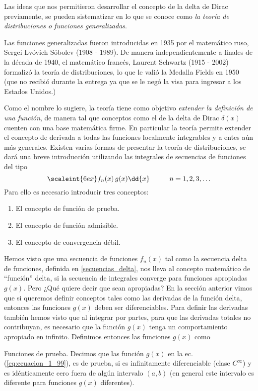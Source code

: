 Las ideas que nos permitieron desarrollar el concepto de la delta de Dirac previamente, se pueden sistematizar en lo que se conoce como \emph{la teoría de distribuciones o funciones generalizadas}.
\par
Las funciones generalizadas fueron introducidas en 1935 por el matemático ruso, Sergei Lvóvich Sóbolev (1908 - 1989). De manera independientemente a finales de la década de 1940, el matemático francés, Laurent Schwartz (1915 - 2002) formalizó la teoría de distribuciones, lo que le valió la Medalla Fields en 1950 (que no recibió durante la entrega ya que se le negó la visa para ingresar a los Estados Unidos.)
\par
Como el nombre lo sugiere, la teoría tiene como objetivo  \emph{extender la definición de una función}, de manera tal que conceptos como el de la delta de Dirac $\delta (x)$ cuenten con una base matemática firme. En particular la teoría permite extender el concepto de derivada a todas las funciones localmente integrables y a entes aún más generales. Existen varias formas de presentar la teoría de distribuciones, se dará una breve introducción utilizando las integrales de secuencias de funciones del tipo
\begin{equation}
\scaleint{6ex} f_{n} (x) \, g (x) \dd{x} \hspace{1cm} n = 1, 2, 3 , \ldots
\label{eq:ecuacion_1_99}
\end{equation}
Para ello es necesario introducir tres conceptos:
\begin{enumerate}
\item El concepto de función de prueba.
\item El concepto de función admisible.
\item El concepto de convergencia débil.
\end{enumerate}
Hemos visto que una secuencia de funciones $f_{n} (x)$ tal como la secuencia delta de funciones, definida en \ref{secuencias_delta}, nos lleva al concepto matemático de \enquote{función} delta, si la secuencia de integrales converge para funciones apropiadas $g (x)$. Pero ¿Qué quiere decir que sean apropiadas? En la sección anterior vimos que si queremos definir conceptos tales como las derivadas de la función delta, entonces las funciones $g (x)$ deben ser diferenciables. Para definir las derivadas también hemos visto que al integrar por partes, para que las derivadas totales no contribuyan, es necesario que la función $g (x)$ tenga un comportamiento apropiado en infinito. Definimos entonces las funciones $g (x)$ como
\begin{defi}
Funciones de prueba.
Decimos que las función $g (x)$ en la ec. (\ref{eq:ecuacion_1_99}), es de prueba, si es infinitamente diferenciable (clase $C^{\infty}$) y es idénticamente cero fuera de algún intervalo $(a, b)$ (en general este intervalo es diferente para funciones $g (x)$ diferentes).
\end{defi}
